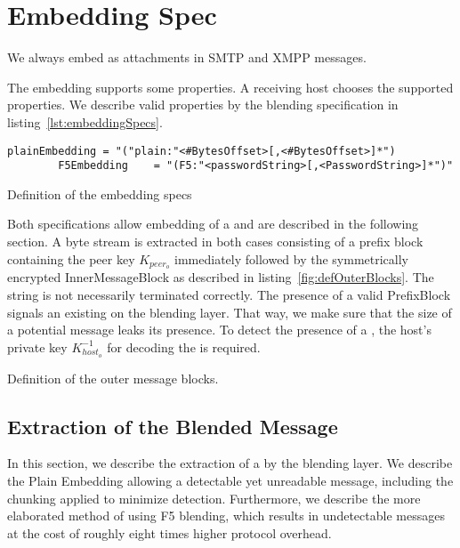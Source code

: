 \section{Embedding Spec}
We always embed \VortexMessages{} as attachments in SMTP and XMPP messages. 

The embedding supports some properties. A receiving host chooses the supported properties. We describe valid properties by the blending specification in listing~\ref{lst:embeddingSpecs}.

\begin{lstfloat}[h!]
	\begin{lstlisting}[language=EBNF]
		plainEmbedding = "("plain:"<#BytesOffset>[,<#BytesOffset>]*")
		F5Embedding    = "(F5:"<passwordString>[,<PasswordString>]*")"
	\end{lstlisting}
	\caption{Definition of the embedding specs}
	\label{lst:embeddingSpecs}
\end{lstfloat}

Both specifications allow embedding of a \VortexMessage{} and are described in the following section. A byte stream is extracted in both cases consisting of a prefix block containing the peer key $K_{peer_o}$ immediately followed by the symmetrically encrypted InnerMessageBlock as described in listing~\ref{fig:defOuterBlocks}. The string is not necessarily terminated correctly. The presence of a valid PrefixBlock signals an existing \VortexMessage{} on the blending layer. That way, we make sure that the size of a potential message leaks its presence. To detect the presence of a \VortexMessage{}, the host's private key $K^{-1}_{host_o}$ for decoding the is required. 

\begin{lstfloat}[ht]
	
	\caption{Definition of the outer message blocks.}
	\label{fig:defOuterBlocks}
\end{lstfloat}

\subsection{Extraction of the Blended Message}
In this section, we describe the extraction of a \VortexMessage{} by the blending layer. We describe the Plain Embedding allowing a detectable yet unreadable message, including the chunking applied to minimize detection. Furthermore, we describe the more elaborated method of using F5  blending, which results in undetectable messages at the cost of roughly eight times higher protocol overhead.

